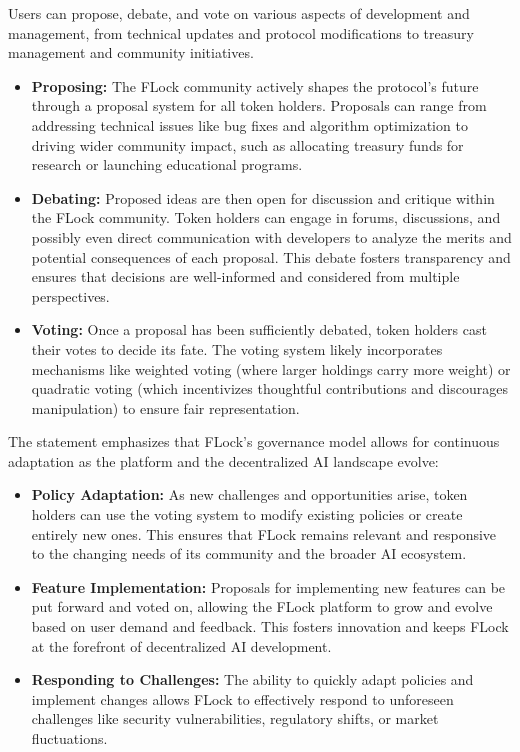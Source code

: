 \documentclass[conference]{IEEEtran}
\begin{document}
Users can propose, debate, and vote on various aspects of  development and management, from technical updates and protocol modifications to treasury management and community initiatives. 
\begin{itemize}
    \item \textbf{Proposing:} The FLock community actively shapes the protocol's future through a proposal system for all token holders.  Proposals can range from addressing technical issues like bug fixes and algorithm optimization to driving wider community impact, such as allocating treasury funds for research or launching educational programs.
    \item \textbf{Debating:} Proposed ideas are then open for discussion and critique within the FLock community. Token holders can engage in forums, discussions, and possibly even direct communication with developers to analyze the merits and potential consequences of each proposal. This debate fosters transparency and ensures that decisions are well-informed and considered from multiple perspectives.
    \item \textbf{Voting:} Once a proposal has been sufficiently debated, token holders cast their votes to decide its fate. The voting system likely incorporates mechanisms like weighted voting (where larger holdings carry more weight) or quadratic voting (which incentivizes thoughtful contributions and discourages manipulation) to ensure fair representation.
\end{itemize}
The statement emphasizes that FLock's governance model allows for
continuous adaptation as the platform and the decentralized AI landscape evolve:

\begin{itemize}
    \item \textbf{Policy Adaptation:} As new challenges and opportunities arise, token holders can use the voting system to modify existing policies or create entirely new ones. This ensures that FLock remains relevant and responsive to the changing needs of its community and the broader AI ecosystem.
    \item \textbf{Feature Implementation:} Proposals for implementing new features can be put forward and voted on, allowing the FLock platform to grow and evolve based on user demand and feedback. This fosters innovation and keeps FLock at the forefront of decentralized AI development.
    \item \textbf{Responding to Challenges:} The ability to quickly adapt policies and implement changes allows FLock to effectively respond to unforeseen challenges like security vulnerabilities, regulatory shifts, or market fluctuations.
\end{itemize}
\end{document}
